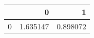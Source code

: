 \begin{tabular}{lrr}
\toprule
{} &         0 &         1 \\
\midrule
0 &  1.635147 &  0.898072 \\
\bottomrule
\end{tabular}
